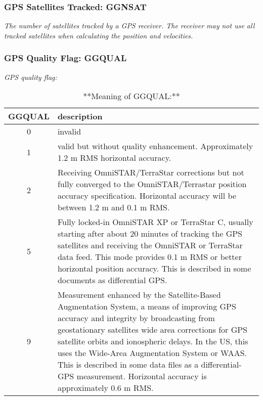 \documentclass[
]{book}
\begin{document}
\hypertarget{ggnsat}{%
\subsubsection*{GPS Satellites Tracked: GGNSAT}\label{ggnsat}}

\emph{The number of satellites tracked by a GPS receiver. The receiver may not use all tracked satellites when calculating the position and velocities.}

\hypertarget{ggqual}{%
\subsubsection*{GPS Quality Flag: GGQUAL}\label{ggqual}}

\emph{GPS quality flag:}

\begin{table}

\caption{\label{tab:unnamed-chunk-34}**Meaning of GGQUAL:**}
\centering
\begin{tabular}[t]{c|l}
\hline
GGQUAL & description\\
\hline
0 & invalid\\
\hline
1 & valid but without quality enhancement. Approximately 1.2 m RMS horizontal accuracy.\\
\hline
2 & Receiving OmniSTAR/TerraStar corrections but not fully converged to the OmniSTAR/Terrastar position accuracy specification. Horizontal accuracy will be between 1.2 m and 0.1 m RMS.\\
\hline
5 & Fully locked-in OmniSTAR XP or TerraStar C, usually starting after about 20 minutes of tracking the GPS satellites and receiving the OmniSTAR or TerraStar data feed. This mode provides 0.1 m RMS or better horizontal position accuracy. This is described in some documents as differential GPS.\\
\hline
9 & Measurement enhanced by the Satellite-Based Augmentation System, a means of improving GPS accuracy and integrity by broadcasting from geostationary satellites wide area corrections for GPS satellite orbits and ionospheric delays. In the US, this uses the Wide-Area Augmentation System or WAAS. This is described in some data files as a differential-GPS measurement. Horizontal accuracy is approximately 0.6 m RMS.\\
\hline
\end{tabular}
\end{table}
\end{document}
